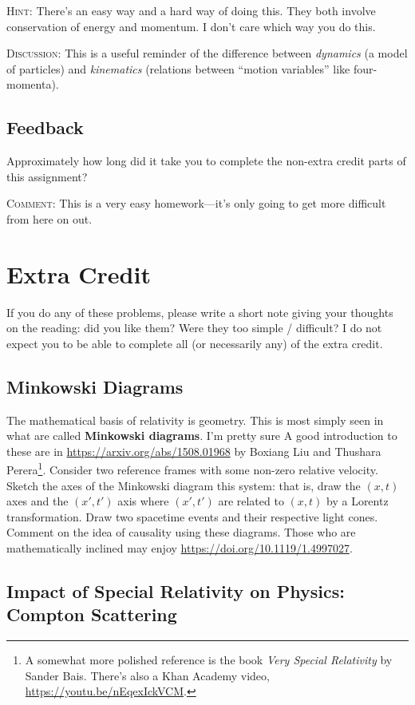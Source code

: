 \documentclass[12pt]{article}
\numberwithin{equation}{section}    %
\begin{document}
\textsc{Hint}: There's an easy way and a hard way of doing this. They both involve conservation of energy and momentum. I don't care which way you do this.

\textsc{Discussion}: This is a useful reminder of the difference between \emph{dynamics} (a model of particles) and \emph{kinematics} (relations between ``motion variables'' like four-momenta).

\subsection{Feedback}

Approximately how long did it take you to complete the non-extra credit parts of this assignment?

\textsc{Comment}: This is a very easy homework---it's only going to get more difficult from here on out.


\section{Extra Credit}

If you do any of these problems, please write a short note giving your thoughts on the reading: did you like them? Were they too simple / difficult? I do not expect you to be able to complete all (or necessarily any) of the extra credit.

\subsection{Minkowski Diagrams}

The mathematical basis of relativity is geometry. This is most simply seen in what are called \textbf{Minkowski diagrams}. I'm pretty sure  A good introduction to these are in \url{https://arxiv.org/abs/1508.01968} by Boxiang Liu and Thushara Perera\footnote{A somewhat more polished reference is the book \emph{Very Special Relativity} by Sander Bais. There's also a Khan Academy video, \url{https://youtu.be/nEqexIckVCM}.}. Consider two reference frames with some non-zero relative velocity. Sketch the axes of the Minkowski diagram this system: that is, draw the $(x,t)$ axes and the $(x',t')$ axis where $(x',t')$ are related to $(x,t)$ by a Lorentz transformation.  Draw two spacetime events and their respective light cones. Comment on the idea of causality using these diagrams. Those who are mathematically inclined may enjoy \url{https://doi.org/10.1119/1.4997027}. 

\subsection{Impact of Special Relativity on Physics: Compton Scattering}
\end{document}
